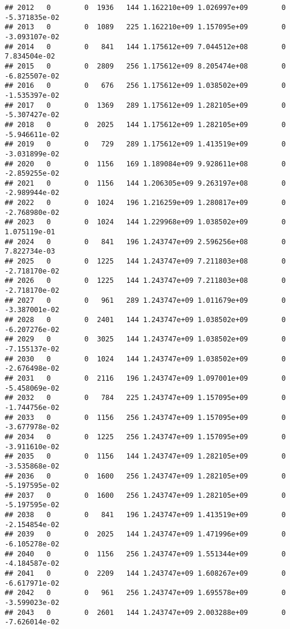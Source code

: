 \documentclass[
]{article}
\begin{document}
\begin{enumerate}
\begin{verbatim}
## 2012   0        0  1936   144 1.162210e+09 1.026997e+09        0 -5.371835e-02
## 2013   0        0  1089   225 1.162210e+09 1.157095e+09        0 -3.093107e-02
## 2014   0        0   841   144 1.175612e+09 7.044512e+08        0  7.834504e-02
## 2015   0        0  2809   256 1.175612e+09 8.205474e+08        0 -6.825507e-02
## 2016   0        0   676   256 1.175612e+09 1.038502e+09        0 -1.535397e-02
## 2017   0        0  1369   289 1.175612e+09 1.282105e+09        0 -5.307427e-02
## 2018   0        0  2025   144 1.175612e+09 1.282105e+09        0 -5.946611e-02
## 2019   0        0   729   289 1.175612e+09 1.413519e+09        0 -3.031899e-02
## 2020   0        0  1156   169 1.189084e+09 9.928611e+08        0 -2.859255e-02
## 2021   0        0  1156   144 1.206305e+09 9.263197e+08        0 -2.989944e-02
## 2022   0        0  1024   196 1.216259e+09 1.280817e+09        0 -2.768980e-02
## 2023   0        0  1024   144 1.229968e+09 1.038502e+09        0  1.075119e-01
## 2024   0        0   841   196 1.243747e+09 2.596256e+08        0  7.822734e-03
## 2025   0        0  1225   144 1.243747e+09 7.211803e+08        0 -2.718170e-02
## 2026   0        0  1225   144 1.243747e+09 7.211803e+08        0 -2.718170e-02
## 2027   0        0   961   289 1.243747e+09 1.011679e+09        0 -3.387001e-02
## 2028   0        0  2401   144 1.243747e+09 1.038502e+09        0 -6.207276e-02
## 2029   0        0  3025   144 1.243747e+09 1.038502e+09        0 -7.155137e-02
## 2030   0        0  1024   144 1.243747e+09 1.038502e+09        0 -2.676498e-02
## 2031   0        0  2116   196 1.243747e+09 1.097001e+09        0 -5.458069e-02
## 2032   0        0   784   225 1.243747e+09 1.157095e+09        0 -1.744756e-02
## 2033   0        0  1156   256 1.243747e+09 1.157095e+09        0 -3.677978e-02
## 2034   0        0  1225   256 1.243747e+09 1.157095e+09        0 -3.911610e-02
## 2035   0        0  1156   144 1.243747e+09 1.282105e+09        0 -3.535868e-02
## 2036   0        0  1600   256 1.243747e+09 1.282105e+09        0 -5.197595e-02
## 2037   0        0  1600   256 1.243747e+09 1.282105e+09        0 -5.197595e-02
## 2038   0        0   841   196 1.243747e+09 1.413519e+09        0 -2.154854e-02
## 2039   0        0  2025   144 1.243747e+09 1.471996e+09        0 -6.105278e-02
## 2040   0        0  1156   256 1.243747e+09 1.551344e+09        0 -4.184587e-02
## 2041   0        0  2209   144 1.243747e+09 1.608267e+09        0 -6.617971e-02
## 2042   0        0   961   256 1.243747e+09 1.695578e+09        0 -3.599023e-02
## 2043   0        0  2601   144 1.243747e+09 2.003288e+09        0 -7.626014e-02

\end{verbatim}
\end{enumerate}
\end{document}
